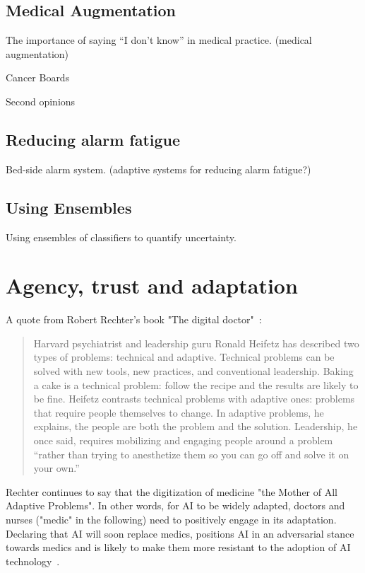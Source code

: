 \documentclass[fleqn,10pt]{wlscirep}
\begin{document}
\subsection*{Medical Augmentation}
The importance of saying “I don’t know” in medical practice. (medical augmentation)

Cancer Boards

Second opinions

\subsection*{Reducing alarm fatigue}
Bed-side alarm system. (adaptive systems for reducing alarm fatigue?)

\subsection*{Using Ensembles}

Using ensembles of classifiers to quantify uncertainty.

\section{Agency, trust and adaptation}

A quote from Robert Rechter's book "The digital doctor"~\cite{wachter2015digital}:
\begin{quote}
    Harvard psychiatrist and leadership guru Ronald Heifetz has described two types of problems: technical and adaptive. Technical problems can be solved with new tools, new practices, and conventional leadership. Baking a cake is a technical problem: follow the recipe and the results are likely to be fine. Heifetz contrasts technical problems with adaptive ones: problems that require people themselves to change. In adaptive problems, he explains, the people
    are both the problem and the solution. Leadership, he once said, requires mobilizing and engaging people around a problem “rather than trying to anesthetize them so you can go off and solve it on your own.” 
\end{quote}

Rechter continues to say that the digitization of medicine "the Mother of All Adaptive Problems". In other words, for AI to be widely adapted, doctors and nurses ("medic" in the following) need to positively engage in its adaptation. Declaring that AI will soon replace medics, positions AI in an adversarial stance towards medics and is likely to make them more resistant to the adoption of AI technology~\cite{topol2019deep}.
\end{document}
